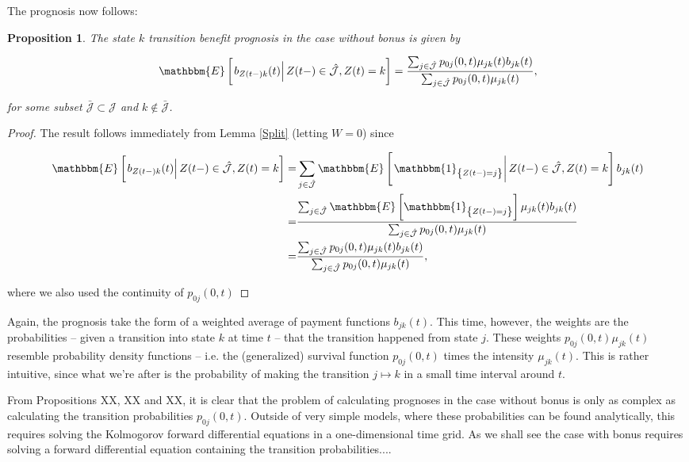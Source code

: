 \documentclass{article}
\newcommand{\1}[1]{\mathbbm{1}_{\left\lbrace #1 \right\rbrace}}
\newcommand{\expec}[1][def]{\mathbbm{E} \left[ #1 \right]}
\newcommand{\econd}[2][def]{\mathbbm{E} \left[ \left. #1 \right| #2 \right]}
\theoremstyle{break}
\newtheorem{proposition}[definition]{Proposition}%
\theoremstyle{remark}
\newenvironment{remark}
  {\pushQED{\qed}\renewcommand{\qedsymbol}{\scalebox{1.4}{$\circ$}}\remarkx}
  {\popQED\endremarkx}
\numberwithin{equation}{section}
\begin{document}
The prognosis now follows:

\begin{proposition} \label{TransitionWithoutBonus}
The state $k$ transition benefit prognosis in the case without bonus is given by

\begin{align*}
    \econd[b_{Z(t-)k}(t)]{Z(t-) \in \hat{\mathcal{J}}, Z(t)=k} = \frac{\sum_{j \in \hat{\mathcal{J}}} p_{0j}(0,t) \mu_{jk}(t) b_{jk}(t)}{\sum_{j \in \hat{\mathcal{J}}} p_{0j}(0,t) \mu_{jk}(t)},
\end{align*}

for some subset $\bar{\mathcal{J}} \subset \mathcal{J}$ and $k \notin \bar{\mathcal{J}}$.
\end{proposition}
\begin{proof}
The result follows immediately from Lemma \ref{Split} (letting $W=0$) since

\begin{align*}
	\econd[b_{Z(t-)k}(t)]{Z(t-) \in \hat{\mathcal{J}}, Z(t)=k} =& \sum_{j \in \hat{\mathcal{J}}} \econd[\1{Z(t-)=j}]{Z(t-) \in \hat{\mathcal{J}}, Z(t) = k} b_{jk}(t) \\
	=&\frac{\sum_{j \in \hat{\mathcal{J}}} \expec[\1{Z(t-)=j}] \mu_{jk}(t) b_{jk}(t)}{\sum_{j \in \hat{\mathcal{J}}} p_{0j}(0,t) \mu_{jk}(t)} \\
	=&\frac{\sum_{j \in \hat{\mathcal{J}}} p_{0j}(0,t) \mu_{jk}(t) b_{jk}(t)}{\sum_{j \in \hat{\mathcal{J}}} p_{0j}(0,t) \mu_{jk}(t)},
\end{align*}

where we also used the continuity of $p_{0j}(0,t)$
\end{proof}

Again, the prognosis take the form of a weighted average of payment functions $b_{jk}(t)$. This time, however, the weights are the probabilities -- given a transition into state $k$ at time $t$ -- that the transition happened from state $j$. These weights $p_{0j}(0,t) \mu_{jk}(t)$ resemble probability density functions -- i.e. the (generalized) survival function $p_{0j}(0,t)$ times the intensity $\mu_{jk}(t)$. This is rather intuitive, since what we're after is the probability of making the transition $j \mapsto k$ in a small time interval around $t$.

\begin{remark}
	From Propositions XX, XX and XX, it is clear that the problem of calculating prognoses in the case without bonus is only as complex as calculating the transition probabilities $p_{0j}(0,t)$. Outside of very simple models, where these probabilities can be found analytically, this requires solving the Kolmogorov forward differential equations in a one-dimensional time grid. As we shall see the case with bonus requires solving a forward differential equation containing the transition probabilities....
\end{remark}
\end{document}
